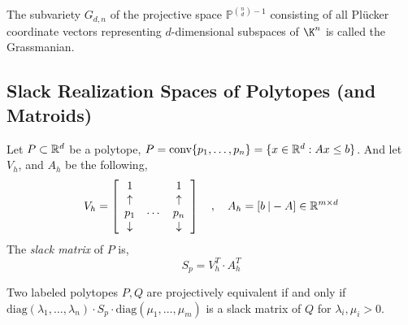 \begin{definition}[Grassmanian]
    The subvariety $G_{d,n}$ of the projective space $\mathbb{P}^{\binom{n}{d} -1}$ consisting of all Pl\"ucker coordinate vectors representing $d$-dimensional subspaces of $\K^n$ is called the Grassmanian.
\end{definition}

\subsection{Slack Realization Spaces of Polytopes (and Matroids)}

\begin{definition}
    Let $P \subset \mathbb{R}^d$ be a polytope, $P = \text{conv}\{p_1, \dots, p_n \} = \{ x \in \mathbb{R}^d : Ax \leq b \}$.
    And let $V_h$, and $A_h$ be the following,
    $$V_h = \left[ \begin{array}{c c c} 1 & & 1 \\ \uparrow & & \uparrow \\ p_1 & \cdots & p_n \\ \downarrow & & \downarrow \end{array} \right] \quad , \quad A_h = [ b \: | -A ] \in \mathbb{R}^{m \times d}$$
    The \textit{slack matrix} of $P$ is,
    $$S_p = V_{h}^T \cdot A_h^T$$
\end{definition}

\begin{proposition}
    Two labeled polytopes $P, Q$ are projectively equivalent if and only if $\text{diag}(\lambda_1, \dots, \lambda_n) \cdot S_p \cdot \text{diag}(\mu_1, \dots, \mu_m)$ is a slack matrix of $Q$ for $\lambda_i, \mu_i > 0$.
\end{proposition}
